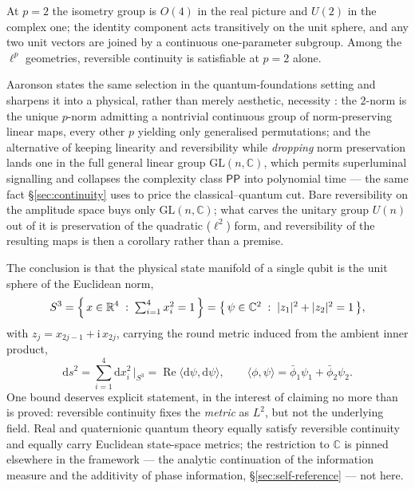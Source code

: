At $p=2$ the isometry group is $O(4)$ in the real picture and $U(2)$ in the
complex one; the identity component acts transitively on the unit sphere, and any
two unit vectors are joined by a continuous one-parameter subgroup. Among the
$\ell^{p}$ geometries, reversible continuity is satisfiable at $p=2$ alone.

Aaronson states the same selection in the quantum-foundations setting and
sharpens it into a physical, rather than merely aesthetic, necessity
\autocite{Aaronson2004h}: the $2$-norm is the unique $p$-norm admitting a
nontrivial continuous group of norm-preserving linear maps, every other $p$
yielding only generalised permutations; and the alternative of keeping linearity
and reversibility while \emph{dropping} norm preservation lands one in the full
general linear group $\mathrm{GL}(n,\mathbb{C})$, which permits superluminal
signalling and collapses the complexity class $\mathsf{PP}$ into polynomial time ---
the same fact \S\ref{sec:continuity} uses to price the classical--quantum cut.
Bare reversibility on the amplitude space buys only $\mathrm{GL}(n,\mathbb{C})$;
what carves the unitary group $U(n)$ out of it is preservation of the quadratic
($\ell^{2}$) form, and reversibility of the resulting maps is then a corollary
rather than a premise.

The conclusion is that the physical state manifold of a single qubit is the unit
sphere of the Euclidean norm,
\begin{equation}
  S^{3}=\Bigl\{\,x\in\mathbb{R}^{4}\;:\;\textstyle\sum_{i=1}^{4}x_{i}^{2}=1\,\Bigr\}
  =\bigl\{\,\psi\in\mathbb{C}^{2}\;:\;\lvert z_{1}\rvert^{2}+\lvert z_{2}\rvert^{2}=1\,\bigr\},
\end{equation}
with $z_{j}=x_{2j-1}+\mathrm{i}\,x_{2j}$, carrying the round metric induced from
the ambient inner product,
\begin{equation}
  \mathrm{d}s^{2}=\sum_{i=1}^{4}\mathrm{d}x_{i}^{2}\,\Big|_{S^{3}}
  =\operatorname{Re}\langle\mathrm{d}\psi,\mathrm{d}\psi\rangle,
  \qquad
  \langle\phi,\psi\rangle=\bar\phi_{1}\psi_{1}+\bar\phi_{2}\psi_{2}.
\end{equation}
One bound deserves explicit statement, in the interest of claiming no more than
is proved: reversible continuity fixes the \emph{metric} as $L^{2}$, but not the
underlying field. Real and quaternionic quantum theory equally satisfy reversible
continuity and equally carry Euclidean state-space metrics; the restriction to
$\mathbb{C}$ is pinned elsewhere in the framework --- the analytic continuation of the
information measure and the additivity of phase information, \S\ref{sec:self-reference} --- not
here.

